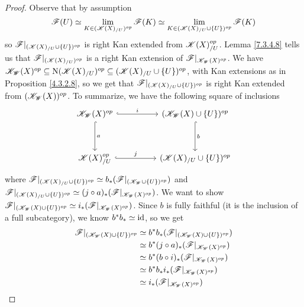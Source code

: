\documentclass[../../thesis.tex]{subfiles}
\begin{document}
\begin{proof}
    Observe that by assumption
    \[
        \mathscr{F}(U)  \simeq \lim_{K\in (\mathscr{K}(X)_{/U})^{op}} \mathscr{F}(K) \simeq \lim_{K\in (\mathscr{K}(X)_{/U} \cup \{U\})^{op}} \mathscr{F}(K)
    \]
    so $\mathscr{F}|_{(\mathscr{K}(X)_{/U} \cup \{U\})^{op}}$ is right Kan extended from $\mathscr{K}(X)_{/U}^{op}$.
    Lemma \ref{7.3.4.8} tells us that $\mathscr{F}|_{(\mathscr{K}(X)_{/U})^{op}}$ is a right Kan extension of $\mathscr{F}|_{\mathscr{K}_{\mathscr{W}}(X)^{op}}$.
    We have ${\mathscr{K}_{\mathscr{W}}(X)^{op} \subseteq\mathrm{N}(\mathscr{K}(X)_{/U})^{op} \subseteq (\mathscr{K}(X)_{/U} \cup \{U\})^{op}}$, with Kan extensions as in Proposition \ref{4.3.2.8}, so we get that ${\mathscr{F}|_{(\mathscr{K}(X)_{/U} \cup \{U\})^{op}}}$ is right Kan extended from ${(\mathscr{K}_{\mathscr{W}}(X))^{op}}$.
    To summarize, we have the following square of inclusions
    \[\begin{tikzcd}
            {\K_{\W}(X)^{op}} && {(\K_{\W}(X)\cup \{U\})^{op}} \\
            \\
            {\K(X)_{/U}^{op}} && {(\K(X)_{/U} \cup \{U\})^{op}}
            \arrow["{b}", hook, from=1-3, to=3-3]
            \arrow["{j}", hook, from=3-1, to=3-3]
            \arrow["{a}", hook, from=1-1, to=3-1]
            \arrow["{i}" ,hook, from=1-1, to=1-3]
        \end{tikzcd}\]
    where $\mathscr{F}|_{(\mathscr{K}(X)_{/U} \cup \{ U \})^{op}} \simeq b_*(\mathscr{F}|_{(\mathscr{K}_{\mathscr{W}} \cup \{U\})^{op}})$ and $\mathscr{F}|_{(\mathscr{K}(X)_{/U} \cup \{U\})^{op}} \simeq (j\circ a)_*(\mathscr{F}|_{\mathscr{K}_{\mathscr{W}}(X)^{op}})$.
    We want to show $\mathscr{F}|_{(\mathscr{K}_{\mathscr{W}}(X) \cup \{U\})^{op}} \simeq i_*(\mathscr{F}|_{\mathscr{K}_{\mathscr{W}}(X)^{op}})$.
    Since $b$ is fully faithful (it is the inclusion of a full subcategory), we know $b^*b_* \simeq \operatorname{id}$, so we get
    \begin{align*}
        \mathscr{F}|_{(\mathscr{K}_{\mathscr{W}}(X)\cup \{U\})^{op}} & \simeq b^*b_*(\mathscr{F}|_{(\mathscr{K}_{\mathscr{W}}(X)\cup \{U\})^{op}}) \\
                                        & \simeq b^*(j\circ a)_* (\mathscr{F}|_{\mathscr{K}_{\mathscr{W}}(X)^{op}})   \\
                                        & \simeq b^*(b \circ i)_*(\mathscr{F}|_{\mathscr{K}_{\mathscr{W}}(X)^{op}})   \\
                                        & \simeq b^*b_*i_*(\mathscr{F}|_{\mathscr{K}_{\mathscr{W}}(X)^{op}})          \\
                                        & \simeq i_*(\mathscr{F}|_{\mathscr{K}_{\mathscr{W}}(X)^{op}}) \qedhere
    \end{align*}
\end{proof}
\end{document}
